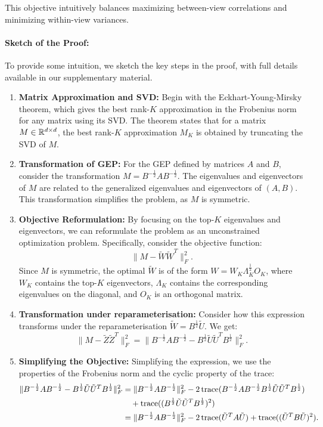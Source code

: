 This objective intuitively balances maximizing between-view correlations and minimizing within-view variances.

\paragraph{Sketch of the Proof:}
To provide some intuition, we sketch the key steps in the proof, with full details available in our supplementary material.

\begin{enumerate}
    \item \textbf{Matrix Approximation and SVD:} Begin with the Eckhart-Young-Mirsky theorem, which gives the best rank-$K$ approximation in the Frobenius norm for any matrix using its SVD. The theorem states that for a matrix \(M \in \mathbb{R}^{d \times d}\), the best rank-$K$ approximation \(M_K\) is obtained by truncating the SVD of \(M\).
    
    \item \textbf{Transformation of GEP:} For the GEP defined by matrices \(A\) and \(B\), consider the transformation \(M = B^{-\frac{1}{2}} A B^{-\frac{1}{2}}\). The eigenvalues and eigenvectors of \(M\) are related to the generalized eigenvalues and eigenvectors of \((A,B)\). This transformation simplifies the problem, as \(M\) is symmetric.

    \item \textbf{Objective Reformulation:} By focusing on the top-$K$ eigenvalues and eigenvectors, we can reformulate the problem as an unconstrained optimization problem. Specifically, consider the objective function:
    \[
    \| M - \tilde{W} \tilde{W}^T \|_F^2.
    \]
    Since \(M\) is symmetric, the optimal \(\tilde{W}\) is of the form \(W = W_K \Lambda_K^{\frac{1}{2}} O_K\), where \(W_K\) contains the top-$K$ eigenvectors, \(\Lambda_K\) contains the corresponding eigenvalues on the diagonal, and \(O_K\) is an orthogonal matrix.

    \item \textbf{Transformation under reparameterisation:} Consider how this expression transforms under the reparameterisation \(\tilde{W} = B^{\frac{1}{2}} \tilde{U}\). We get:
    \[
    \| M - \tilde{Z} \tilde{Z}^T \|_F^2 = \| B^{-\frac{1}{2}} A B^{-\frac{1}{2}} - B^{\frac{1}{2}} \tilde{U} \tilde{U}^T B^{\frac{1}{2}} \|_F^2.
    \]

    \item \textbf{Simplifying the Objective:} Simplifying the expression, we use the properties of the Frobenius norm and the cyclic property of the trace:
    \begin{align*}
        \| B^{-\frac{1}{2}} A B^{-\frac{1}{2}} - B^{\frac{1}{2}} \tilde{U} \tilde{U}^T B^{\frac{1}{2}} \|_F^2 &= \| B^{-\frac{1}{2}} A B^{-\frac{1}{2}} \|_F^2 - 2 \operatorname{trace}(B^{-\frac{1}{2}} A B^{-\frac{1}{2}} B^{\frac{1}{2}} \tilde{U} \tilde{U}^T B^{\frac{1}{2}}) \\
        &\quad + \operatorname{trace}((B^{\frac{1}{2}} \tilde{U} \tilde{U}^T B^{\frac{1}{2}})^2) \\
        &= \| B^{-\frac{1}{2}} A B^{-\frac{1}{2}} \|_F^2 - 2 \operatorname{trace}(\tilde{U}^T A \tilde{U}) + \operatorname{trace}((\tilde{U}^T B \tilde{U})^2).
    \end{align*}


\end{enumerate}
